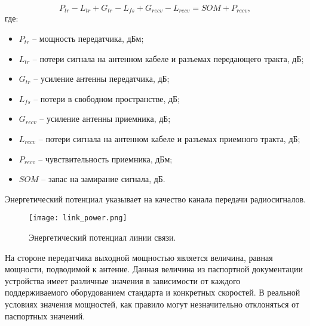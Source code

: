 

\begin{equation}
  \label{eq:part3_link_budget}
  P_{tr} - L_{tr} + G_{tr} - L_{fs} + G_{recv} - L_{recv} = SOM + P_{recv},
\end{equation}
где:

\begin{itemize}

  \item $P_{tr}$ -- мощность передатчика, дБм;

  \item $L_{tr}$ -- потери сигнала на антенном кабеле и разъемах передающего тракта, дБ;

  \item $G_{tr}$ -- усиление антенны передатчика, дБ;

  \item $L_{fs}$ -- потери в свободном пространстве, дБ;

  \item $G_{recv}$ -- усиление антенны приемника, дБ;

  \item $L_{recv}$ -- потери сигнала на антенном кабеле и разъемах приемного тракта, дБ;

  \item $P_{recv}$ -- чувствительность приемника, дБм;
  
  \item $SOM$ -- запас на замирание сигнала, дБ.

\end{itemize}
Энергетический потенциал указывает на качество канала передачи радиосигналов.

\begin{figure}[h!]
  \centering
   \texttt{[image: link\_power.png]}
\caption{Энергетический потенциал линии связи.}
\label{fig:link_power}
\end{figure}

На стороне передатчика выходной мощностью является величина, равная мощности, подводимой к антенне. Данная величина из паспортной документации устройства имеет различные значения в зависимости от каждого поддерживаемого оборудованием стандарта и конкретных скоростей. В реальной условиях значения мощностей, как правило могут незначительно отклоняться от паспортных значений. 


